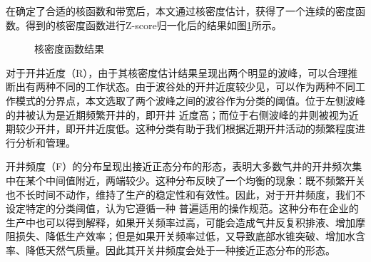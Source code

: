 在确定了合适的核函数和带宽后，本文通过核密度估计，获得了一个连续的密度函数。得到的核密度函数进行Z-score归一化后的结果如图\ref{fig:KDE}所示。
\begin{figure}[H]
    \centering
    \hfil
    \hfil
    \caption{核密度函数结果}
    \label{fig:KDE}
\end{figure}
\par
对于开井近度（R），由于其核密度估计结果呈现出两个明显的波峰，可以合理推断出有两种不同的工作状态。由于波谷处的开井近度较少见，可以作为两种不同工作模式的分界点，本文选取了两个波峰之间的波谷作为分类的阈值。位于左侧波峰的井被认为是近期频繁开井的，即开井
近度高；而位于右侧波峰的井则被视为近期较少开井，即开井近度低。这种分类有助于我们根据近期开井活动的频繁程度进行分析和管理。

开井频度（F）的分布呈现出接近正态分布的形态，表明大多数气井的开井频次集中在某个中间值附近，两端较少。这种分布反映了一个均衡的现象：既不频繁开关也不长时间不动作，维持了生产的稳定性和有效性。因此，对于开井频度，我们不设定特定的分类阈值，认为它遵循一种
普遍适用的操作规范。这种分布在企业的生产中也可以得到解释，如果开关频率过高，可能会造成气井反复积排液、增加摩阻损失、降低生产效率；但是如果开关频率过低，又导致底部水锥突破、增加水含率、降低天然气质量。因此其开关井频度会处于一种接近正态分布的形态。

